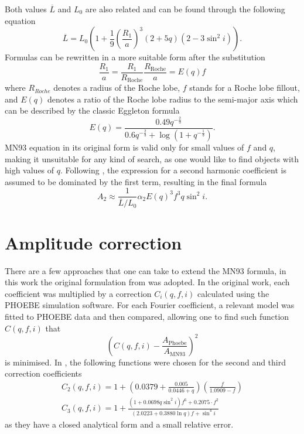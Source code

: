 \documentclass{pracalicmgr}
\begin{document}
Both values $\overline{L}$ and $L_0$ are also related and can be found through the following equation
\begin{equation}
    \overline{L}=L_0\left(1+\frac{1}{9}\left(\frac{R_1}{a}\right)^3(2+5q)(2-3\sin^2{i})\right).
\end{equation}
Formulas can be rewritten in a more suitable form after the substitution
\begin{equation}
    \frac{R_1}{a}=\frac{R_1}{R_{\textrm{Roche}}}\frac{R_{\textrm{Roche}}}{a}=E(q)f
\end{equation}
where $R_{Roche}$ 
denotes a radius of the Roche lobe, $f$ stands for a Roche lobe fillout, and $E(q)$ denotes a ratio of the Roche lobe radius to the semi-major axis which can be described by the classic Eggleton formula 
\citep{eggleton_approximations_1983}
\begin{equation}
    E(q)=\frac{0.49q^{-\frac{2}{3}}}{0.6q^{-\frac{2}{3}}+\log{(1+q^{-\frac{1}{3}})}}.
\end{equation}
MN93 equation in its original form is valid only for small values of $f$ and $q$, making it unsuitable for any kind of search, as one would like to find objects with high values of $q$.
Following \citet{gomel_search_2021-1}, the expression for a second harmonic coefficient is assumed to be dominated by the first term, resulting in the final formula 
\begin{equation}
    A_2\approx \frac{1}{\overline{L}/L_0} \alpha_2 E(q)^3 f^3 q \sin^2{i}.
\end{equation}
\section{Amplitude correction}
There are a few approaches that one can take to extend the MN93 formula, in this work the original formulation from \citet{gomel_search_2021-1} was adopted.
In the original work, each coefficient was multiplied by a correction $C_i(q,f, i)$ calculated using the PHOEBE simulation software. For each
Fourier coefficient, a relevant model was fitted to PHOEBE data and then compared, allowing one to find such function $C(q,f, i)$ that 
\begin{equation}
    \left(C(q,f,i)-\frac{A_{\textrm{Phoebe}}}{A_{\textrm{MN93}}}\right)^2
\end{equation}
is minimised. In \citet{gomel_search_2021-1}, the following functions were chosen for the second and third correction coefficients
\begin{align}
    C_2(q,f,i)=1+\left(0.0379+\frac{0.005}{0.0446+q}\right)\left(\frac{f}{1.0909-f}\right)\\
    C_3(q,f,i)=1+\frac{(1+0.0698q\sin^2{i})f^6+0.2075\cdot f^2}{(2.0223+0.3880\ln{q})f+\sin^4{i}}
\end{align}
as they have a closed analytical form and a small relative error. 
\end{document}
